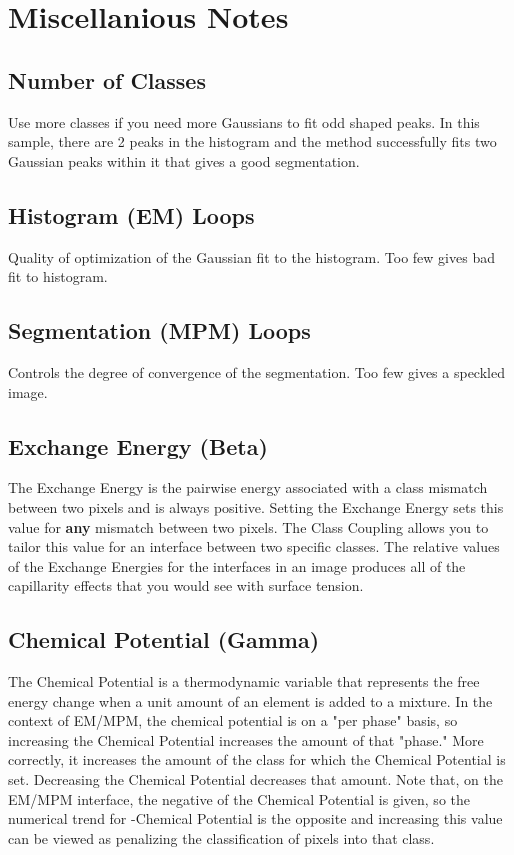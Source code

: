 \documentclass[12pt,oneside]{book}
\begin{document}
\chapter{Miscellanious Notes}

\section{Number of Classes}
Use more classes if you need more Gaussians to fit odd shaped peaks. In this sample, there are 2 peaks in the histogram and the method successfully fits two Gaussian peaks within it that gives a good segmentation.

\section{Histogram (EM) Loops}
Quality of optimization of the Gaussian fit to the histogram. Too few gives bad fit to histogram.

\section{Segmentation (MPM) Loops}
Controls the degree of convergence of the segmentation. Too few gives a speckled image.

\section{Exchange Energy (Beta)}
The Exchange Energy is the pairwise energy associated with a class mismatch
between two pixels and is always positive. Setting the Exchange Energy sets
this value for {\bfseries any} mismatch between two pixels. The Class Coupling allows
you to tailor this value for an interface between two specific classes. The
relative values of the Exchange Energies for the interfaces in an image
produces all of the capillarity effects that you would see with surface
tension.

\section{Chemical Potential (Gamma)}
The Chemical Potential is a thermodynamic variable that represents the free
energy change when a unit amount of an element is added to a mixture. In the
context of EM/MPM, the chemical potential is on a "per phase" basis, so
increasing the Chemical Potential increases the amount of that "phase." More
correctly, it increases the amount of the class for which the Chemical
Potential is set. Decreasing the Chemical Potential decreases that amount.
Note that, on the EM/MPM interface, the negative of the Chemical Potential
is given, so the numerical trend for -Chemical Potential is the opposite and
increasing this value can be viewed as penalizing the classification of
pixels into that class.
\end{document}
